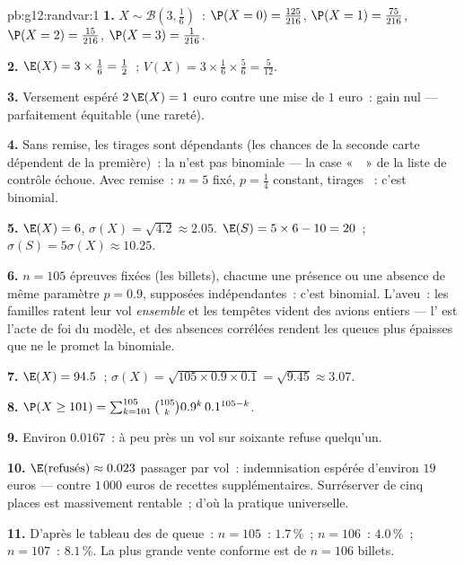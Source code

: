 \begin{solution}{pb:g12:randvar:1}
\textbf{1.} $X \sim \mathcal B\!\left(3, \frac16\right)$~:
$\P(X = 0) = \frac{125}{216}$,
$\P(X = 1) = \frac{75}{216}$,
$\P(X = 2) = \frac{15}{216}$,
$\P(X = 3) = \frac{1}{216}$.

\textbf{2.} $\E(X) = 3 \times \frac16 = \frac12$~;
$V(X) = 3 \times \frac16 \times \frac56 = \frac{5}{12}$.

\textbf{3.} Versement espéré $2\,\E(X) = 1$ euro contre une mise
de $1$ euro~: gain nul --- parfaitement équitable (une rareté).

\textbf{4.} Sans remise, les tirages sont dépendants (les chances
de la seconde carte dépendent de la première)~: la  n'est pas
binomiale --- la case «~~» de la liste de contrôle
échoue. Avec remise~: $n = 5$ fixé, $p = \frac14$ constant,
tirages ~: c'est binomial.

\textbf{5.} $\E(X) = 6$, $\sigma(X) = \sqrt{4.2} \approx 2.05$.
$\E(S) = 5 \times 6 - 10 = 20$~;
$\sigma(S) = 5\sigma(X) \approx 10.25$.

\textbf{6.} $n = 105$ épreuves fixées (les billets), chacune une
présence ou une absence de même paramètre $p = 0.9$, supposées
indépendantes~: c'est binomial. L'aveu~: les familles ratent leur
vol \emph{ensemble} et les tempêtes vident des avions entiers ---
l' est l'acte de foi du modèle, et des absences
corrélées rendent les queues plus épaisses que ne le promet la
binomiale.

\textbf{7.} $\E(X) = 94.5$~;
$\sigma(X) = \sqrt{105 \times 0.9 \times 0.1} = \sqrt{9.45}
\approx 3.07$.

\textbf{8.} $\P(X \geq 101) = \sum_{k=101}^{105}
\binom{105}{k} 0.9^k\, 0.1^{105 - k}$.

\textbf{9.} Environ $0.0167$~: à peu près un vol sur soixante
refuse quelqu'un.

\textbf{10.} $\E(\text{refusés}) \approx 0.023$ passager par vol~:
indemnisation espérée d'environ $19$ euros --- contre $1\,000$
euros de recettes supplémentaires. Surréserver de cinq places est
massivement rentable~; d'où la pratique universelle.

\textbf{11.} D'après le tableau des  de queue~:
$n = 105$~: $1.7\,\%$~; $n = 106$~: $4.0\,\%$~; $n = 107$~:
$8.1\,\%$. La plus grande vente conforme est de $n = 106$ billets.


\end{solution}
